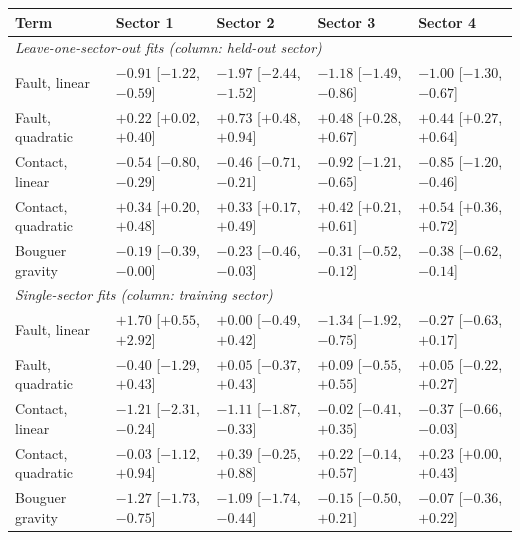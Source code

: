 \begin{tabular}{lllll}
\toprule
Term & Sector 1 & Sector 2 & Sector 3 & Sector 4 \\
\midrule
\multicolumn{5}{l}{\emph{Leave-one-sector-out fits (column: held-out sector)}} \\
\quad Fault, linear & $-0.91$ [$-1.22$, $-0.59$] & $-1.97$ [$-2.44$, $-1.52$] & $-1.18$ [$-1.49$, $-0.86$] & $-1.00$ [$-1.30$, $-0.67$] \\
\quad Fault, quadratic & $+0.22$ [$+0.02$, $+0.40$] & $+0.73$ [$+0.48$, $+0.94$] & $+0.48$ [$+0.28$, $+0.67$] & $+0.44$ [$+0.27$, $+0.64$] \\
\quad Contact, linear & $-0.54$ [$-0.80$, $-0.29$] & $-0.46$ [$-0.71$, $-0.21$] & $-0.92$ [$-1.21$, $-0.65$] & $-0.85$ [$-1.20$, $-0.46$] \\
\quad Contact, quadratic & $+0.34$ [$+0.20$, $+0.48$] & $+0.33$ [$+0.17$, $+0.49$] & $+0.42$ [$+0.21$, $+0.61$] & $+0.54$ [$+0.36$, $+0.72$] \\
\quad Bouguer gravity & $-0.19$ [$-0.39$, $-0.00$] & $-0.23$ [$-0.46$, $-0.03$] & $-0.31$ [$-0.52$, $-0.12$] & $-0.38$ [$-0.62$, $-0.14$] \\
\multicolumn{5}{l}{\emph{Single-sector fits (column: training sector)}} \\
\quad Fault, linear & $+1.70$ [$+0.55$, $+2.92$] & $+0.00$ [$-0.49$, $+0.42$] & $-1.34$ [$-1.92$, $-0.75$] & $-0.27$ [$-0.63$, $+0.17$] \\
\quad Fault, quadratic & $-0.40$ [$-1.29$, $+0.43$] & $+0.05$ [$-0.37$, $+0.43$] & $+0.09$ [$-0.55$, $+0.55$] & $+0.05$ [$-0.22$, $+0.27$] \\
\quad Contact, linear & $-1.21$ [$-2.31$, $-0.24$] & $-1.11$ [$-1.87$, $-0.33$] & $-0.02$ [$-0.41$, $+0.35$] & $-0.37$ [$-0.66$, $-0.03$] \\
\quad Contact, quadratic & $-0.03$ [$-1.12$, $+0.94$] & $+0.39$ [$-0.25$, $+0.88$] & $+0.22$ [$-0.14$, $+0.57$] & $+0.23$ [$+0.00$, $+0.43$] \\
\quad Bouguer gravity & $-1.27$ [$-1.73$, $-0.75$] & $-1.09$ [$-1.74$, $-0.44$] & $-0.15$ [$-0.50$, $+0.21$] & $-0.07$ [$-0.36$, $+0.22$] \\
\bottomrule
\end{tabular}
